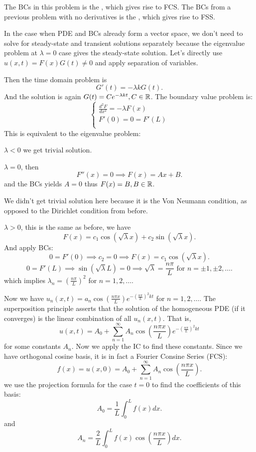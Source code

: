 \documentclass[class=article,crop=false]{standalone}
\begin{document}
\begin{note}[]
	The BCs in this problem is the , which gives rise to FCS. The BCs from a previous problem with no derivatives is the , which gives rise to FSS.  
\end{note}
\begin{note}[]
	In the case when PDE and BCs already form a vector space, we don't need to solve for steady-state and transient solutions separately because the eigenvalue problem at $ \lambda = 0$ case gives the steady-state solution. Let's directly use $ u(x,t)=F(x)G(t) \neq 0$ and apply separation of variables.
\end{note}
Then the time domain problem is
	\[
		G'(t)=-\lambda kG(t)
	.\] 
	And the solution is again $ G(t) = Ce^{-\lambda kt}, C \in \mathbb{R}$. The boundary value problem is:
\begin{equation*}
\begin{cases}
	\frac{d^2 F}{d {x }^2} = -\lambda F(x)\\
	F'(0)=0=F'(L)\\
\end{cases}
\end{equation*}
This is equivalent to the eigenvalue problem:
\begin{case}[]
$ \lambda <0$ we get trivial solution.
\end{case}
\begin{case}[]
$ \lambda =0$, then
\[
	F''(x) =0 \implies F(x) = Ax+B
.\] 
and the BCs yields $ A=0$ thus  $ F(x)=B, B \in \mathbb{R}$.
\begin{note}[]
We didn't get trivial solution here because it is the Von Neumann condition, as opposed to the Dirichlet condition from before.
\end{note}
\end{case}
\begin{case}[]
$ \lambda >0$, this is the same as before, we have
\[
	F(x) = c_1 \cos(\sqrt{\lambda }x  ) + c_2 \sin(\sqrt{\lambda } x )
.\] 
And apply BCs:
\[
	0=F'(0) \implies c_2 = 0 \implies F(x) = c_1 \cos(\sqrt{\lambda} x )
.\] 
\[
	0 = F'(L) \implies \sin(\sqrt{\lambda} L ) = 0 \implies \sqrt{\lambda} = \frac{n\pi}{L } \text{ for }  n=\pm 1, \pm 2,\ldots  
.\]
which implies $ \lambda_n =\left( \frac{n\pi}{L } \right)^2 $ for $ n=1,2,\ldots$.

Now we have $ u_n(x,t) = a_n \cos \left( \frac{ n\pi x}{ L} \right) e^{-( \frac{ n\pi}{L} )^2 kt} $ for $ n=1,2,\ldots$. The superposition principle asserts that the solution of the homogeneous PDE (if it converges) is the linear combination of all $ u_n(x,t)$. That is,
\[
	u(x,t) = A_0 + \sum_{ n= 1}^{\infty} A_n \cos \left( \frac{ n\pi x}{ L} \right) e^{-( \frac{ n\pi}{L} )^2 kt} 
\] 
for some constants $ A_n$. Now we apply the IC to find these constants. Since we have orthogonal cosine basis, it is in fact a Fourier Consine Series (FCS): 
 \[
	 f(x) = u(x,0)=A_0 +\sum_{ n= 1}^{\infty} A_n \cos \left( \frac{ n\pi x}{ L} \right) 
 .\] 
 we use the projection formula for the case $ t=0$ to find the coefficients of this basis:
 \[
	 A_0 = \frac{1}{L} \int_{0}^{L} f(x) dx 
 .\] 
 and
 \[
	 A_n = \frac{2}{L}\int_{0}^{L} f(x) \cos \left( \frac{ n\pi x}{ L} \right) dx 
 .\]
\end{case}
\end{document}
